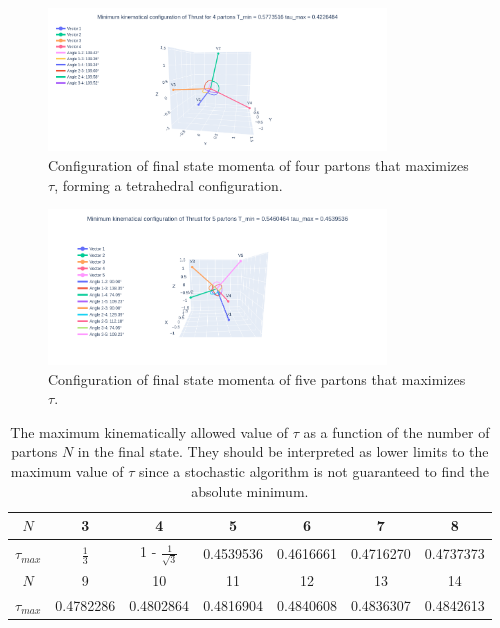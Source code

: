 \documentclass[../Tesi_Jiahao_Miao_986136.tex]{subfiles}
\begin{document}
\begin{figure}
    \centering
    \includegraphics[width=0.8\textwidth]{figures/4_parton.png}
    \caption{Configuration of final state momenta of four partons that maximizes $\tau$, forming a tetrahedral configuration.} 
    \label{fig:4_parton}
\end{figure}

\begin{figure}
    \centering
    \includegraphics[width=0.8\textwidth]{figures/5_parton.png}
    \caption{Configuration of final state momenta of five partons that maximizes $\tau$.} 
    \label{fig:5_parton}
\end{figure}

\begin{table}
    \centering
    \caption{The maximum kinematically allowed value of $\tau$ as a function of the number of partons $N$ in the final state.
    They should be interpreted as lower limits to the maximum value of $\tau$ since a stochastic algorithm is not guaranteed to find the absolute
    minimum.}
    \begin{tabular}{|c|cccccc|}
        \hline
        $N$&3 & 4 & 5 & 6 & 7 &8\\ 
        \hline
        $\tau_{max}$&$\frac{1}{3}$ & 1 - $\frac{1}{\sqrt{3}}$ & 0.4539536 & 0.4616661  & 0.4716270 & 0.4737373\\
        \hline
        $N$& 9 & 10 & 11 & 12 & 13 & 14\\
        \hline
        $\tau_{max}$ & 0.4782286 & 0.4802864 & 0.4816904 & 0.4840608 & 0.4836307& 0.4842613\\
        \hline
    \end{tabular}
    \label{tab:max_tau}
\end{table}
\end{document}
